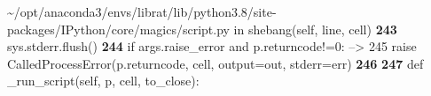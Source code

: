 \documentclass[letterpaper,10pt,english]{sphinxmanual}
\begin{document}
{\begin{sphinxVerbatim}[commandchars=\\\{\}]
\textcolor{ansi-green}{\textasciitilde{}/opt/anaconda3/envs/librat/lib/python3.8/site-packages/IPython/core/magics/script.py} in \textcolor{ansi-cyan}{shebang}\textcolor{ansi-blue}{(self, line, cell)}
\textcolor{ansi-green-intense}{\textbf{    243}}             sys\textcolor{ansi-blue}{.}stderr\textcolor{ansi-blue}{.}flush\textcolor{ansi-blue}{(}\textcolor{ansi-blue}{)}
\textcolor{ansi-green-intense}{\textbf{    244}}         \textcolor{ansi-green}{if} args\textcolor{ansi-blue}{.}raise\_error \textcolor{ansi-green}{and} p\textcolor{ansi-blue}{.}returncode\textcolor{ansi-blue}{!=}\textcolor{ansi-cyan}{0}\textcolor{ansi-blue}{:}
\textcolor{ansi-green}{--> 245}\textcolor{ansi-red}{             }\textcolor{ansi-green}{raise} CalledProcessError\textcolor{ansi-blue}{(}p\textcolor{ansi-blue}{.}returncode\textcolor{ansi-blue}{,} cell\textcolor{ansi-blue}{,} output\textcolor{ansi-blue}{=}out\textcolor{ansi-blue}{,} stderr\textcolor{ansi-blue}{=}err\textcolor{ansi-blue}{)}
\textcolor{ansi-green-intense}{\textbf{    246}}
\textcolor{ansi-green-intense}{\textbf{    247}}     \textcolor{ansi-green}{def} \_run\_script\textcolor{ansi-blue}{(}self\textcolor{ansi-blue}{,} p\textcolor{ansi-blue}{,} cell\textcolor{ansi-blue}{,} to\_close\textcolor{ansi-blue}{)}\textcolor{ansi-blue}{:}


\end{sphinxVerbatim}}
\end{document}
